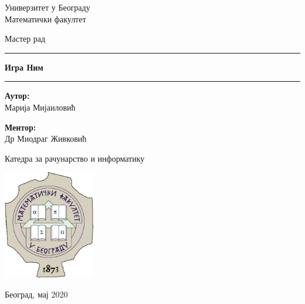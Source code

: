 \begin{titlepage}
    \begin{center}
        \vspace{0.5cm}
        
        \Large{
	        Универзитет у Београду\\
	        Математички факултет\\
        }
    
        \vspace{0.5cm}
        \Large{Мастер рад}    
        
        \vspace{2.0cm}
        
        \Huge
        \rule[0.5cm]{\textwidth}{0.5pt}
        \textbf{Игра Ним}
        \rule{\textwidth}{0.5pt}
        \vspace{0.5cm}
        
        \vspace{2.0cm}
        
        \begin{minipage}[t]{0.47\textwidth}
        	\textnormal{\large{\bf Аутор:\\}}
        	{\large Марија Мијаиловић}
        \end{minipage}\hfill\begin{minipage}[t]{0.47\textwidth}\raggedleft
        	\textnormal{\large{\bf Ментор:\\}}
        	{\large Др Миодраг Живковић}
        \end{minipage}
        
        \vfill
        
        {\Large Катедра за рачунарство и информатику}
        
        \vspace{0.8cm}
        
        \includegraphics[width=0.3\textwidth]{matf_logo.png}
        
        \large{Београд, мај 2020}
        
    \end{center}
\end{titlepage}